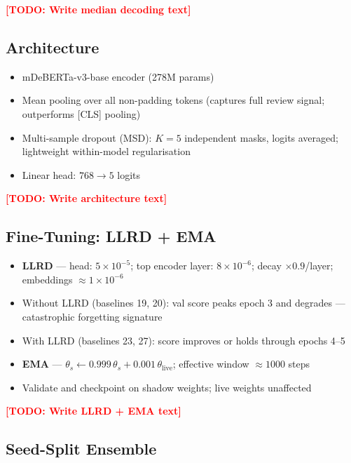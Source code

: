 \documentclass{article}
\newcommand{\TODO}[1]{\textcolor{red}{\textbf{[TODO: #1]}}}
\begin{document}
\TODO{Write median decoding text}

\subsection{Architecture}

\begin{itemize}[leftmargin=*,itemsep=1pt]
  \item mDeBERTa-v3-base encoder (278M params)
  \item Mean pooling over all non-padding tokens (captures full review signal;
        outperforms [CLS] pooling)
  \item Multi-sample dropout (MSD): $K{=}5$ independent masks, logits averaged;
        lightweight within-model regularisation
  \item Linear head: $768 \to 5$ logits
\end{itemize}

\TODO{Write architecture text}

\subsection{Fine-Tuning: LLRD + EMA}

\begin{itemize}[leftmargin=*,itemsep=1pt]
  \item \textbf{LLRD} --- head: $5{\times}10^{-5}$; top encoder layer:
        $8{\times}10^{-6}$; decay $\times 0.9$/layer; embeddings
        $\approx\!1{\times}10^{-6}$
  \item Without LLRD (baselines 19, 20): val score peaks epoch 3 and
        degrades --- catastrophic forgetting signature
  \item With LLRD (baselines 23, 27): score improves or holds through
        epochs 4--5
  \item \textbf{EMA} --- $\theta_s \leftarrow 0.999\,\theta_s +
        0.001\,\theta_{\text{live}}$; effective window $\approx\!1000$ steps
  \item Validate and checkpoint on shadow weights; live weights unaffected
\end{itemize}

\TODO{Write LLRD + EMA text}

\subsection{Seed-Split Ensemble}
\end{document}

